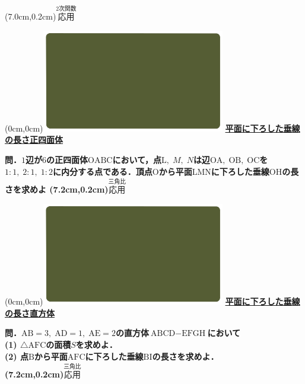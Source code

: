 \documentclass[10pt,
fleqn,
dvipdfmx,
uplatex
]{jsarticle}
\begin{document}
\at(7.0cm,0.2cm){\small\color{bradorange}$\overset{\text{2次関数}}{\text{応用}}$}


\newpage



\at(0cm,0cm){\includegraphics[width=8cm,bb=0 0 1920 1080]{./youtube/thumbnails/templates/smart_background/三角比.jpeg}}
{\color{orange}\bf\boldmath\large\underline{平面に下ろした垂線の長さ正四面体}}\vspace{0.3zw}

\Large 
\bf\boldmath 問．$1$辺が$6$の正四面体$\text{OABC}$において，点$\text{L},\;M,\;N$は辺$\text{OA},\;\text{OB},\;\text{OC}$を$1:1,\;2:1,\;1:2$に内分する点である．頂点$\text{O}$から平面$\text{LMN}$に下ろした垂線$\text{OH}$の長さを求めよ
\at(7.2cm,0.2cm){\small\color{bradorange}$\overset{\text{三角比}}{\text{応用}}$}

\newpage

\at(0cm,0cm){\includegraphics[width=8cm,bb=0 0 1920 1080]{./youtube/thumbnails/templates/smart_background/三角比.jpeg}}
{\color{orange}\bf\boldmath\large\underline{平面に下ろした垂線の長さ直方体}}\vspace{0.3zw}

\large 
\bf\boldmath 問．$\text{AB}=3,\;\text{AD}=1,\;\text{AE}=2$の直方体$\text{ABCD}-\text{EFGH}$において\\
(1)  $\triangle \text{AFC}$の面積$S$を求めよ．\\
(2)  点$\text{B}$から平面$\text{AFC}$に下ろした垂線$\text{BI}$の長さを求めよ．\\

\at(7.2cm,0.2cm){\small\color{bradorange}$\overset{\text{三角比}}{\text{応用}}$}
\end{document}
